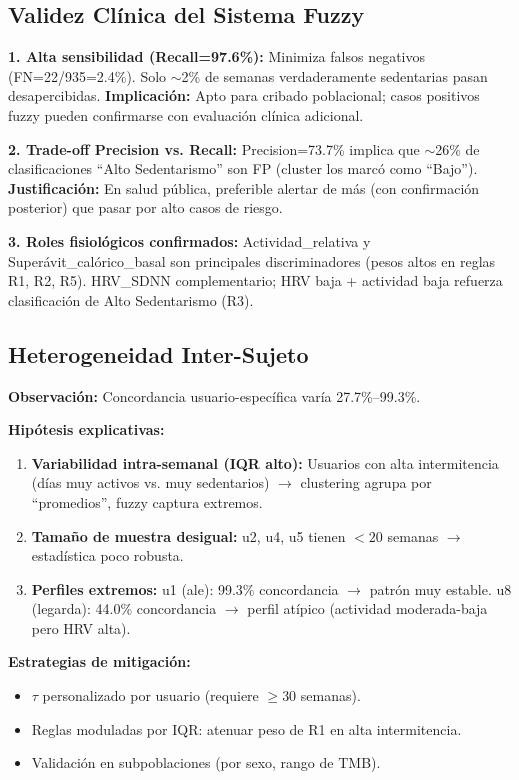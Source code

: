 \documentclass[12pt,a4paper,twoside]{article}
\begin{document}
\subsection{Validez Clínica del Sistema Fuzzy}

\textbf{1. Alta sensibilidad (Recall=97.6\%):} Minimiza falsos negativos (FN=22/935=2.4\%). Solo $\sim$2\% de semanas verdaderamente sedentarias pasan desapercibidas. \textbf{Implicación:} Apto para cribado poblacional; casos positivos fuzzy pueden confirmarse con evaluación clínica adicional.

\textbf{2. Trade-off Precision vs. Recall:} Precision=73.7\% implica que $\sim$26\% de clasificaciones ``Alto Sedentarismo'' son FP (cluster los marcó como ``Bajo''). \textbf{Justificación:} En salud pública, preferible alertar de más (con confirmación posterior) que pasar por alto casos de riesgo.

\textbf{3. Roles fisiológicos confirmados:} Actividad\_relativa y Superávit\_calórico\_basal son principales discriminadores (pesos altos en reglas R1, R2, R5). HRV\_SDNN complementario; HRV baja + actividad baja refuerza clasificación de Alto Sedentarismo (R3).

\subsection{Heterogeneidad Inter-Sujeto}

\textbf{Observación:} Concordancia usuario-específica varía 27.7\%--99.3\%.

\textbf{Hipótesis explicativas:}
\begin{enumerate}
    \item \textbf{Variabilidad intra-semanal (IQR alto):} Usuarios con alta intermitencia (días muy activos vs. muy sedentarios) $\rightarrow$ clustering agrupa por ``promedios'', fuzzy captura extremos.
    \item \textbf{Tamaño de muestra desigual:} u2, u4, u5 tienen $<20$ semanas $\rightarrow$ estadística poco robusta.
    \item \textbf{Perfiles extremos:} u1 (ale): 99.3\% concordancia $\rightarrow$ patrón muy estable. u8 (legarda): 44.0\% concordancia $\rightarrow$ perfil atípico (actividad moderada-baja pero HRV alta).
\end{enumerate}

\textbf{Estrategias de mitigación:}
\begin{itemize}
    \item $\tau$ personalizado por usuario (requiere $\geq 30$ semanas).
    \item Reglas moduladas por IQR: atenuar peso de R1 en alta intermitencia.
    \item Validación en subpoblaciones (por sexo, rango de TMB).
\end{itemize}
\end{document}
